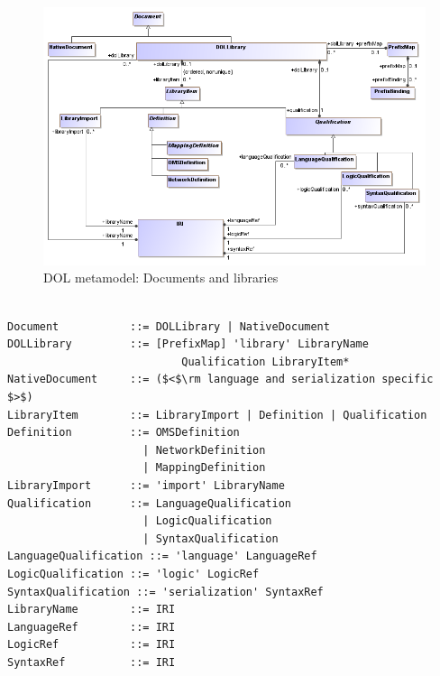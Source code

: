 \documentclass[10pt, a4paper]{isov2}
\begin{document}
\medskip
\begin{figure}
  \centering
    \includegraphics[scale=0.47]{mof/libraries.png}
  \caption{DOL metamodel: Documents and libraries}
  \label{fig:libraries}
\end{figure}


\vspace{-2em}

\begin{lstlisting}[language=ebnf,escapeinside={()},morecomment={[l]{\%\%\ }}]

Document           ::= DOLLibrary | NativeDocument
DOLLibrary         ::= [PrefixMap] 'library' LibraryName
                           Qualification LibraryItem*
NativeDocument     ::= ($<$\rm language and serialization specific $>$) 
LibraryItem        ::= LibraryImport | Definition | Qualification
Definition         ::= OMSDefinition
                     | NetworkDefinition
                     | MappingDefinition
LibraryImport      ::= 'import' LibraryName
Qualification      ::= LanguageQualification
                     | LogicQualification
                     | SyntaxQualification
LanguageQualification ::= 'language' LanguageRef
LogicQualification ::= 'logic' LogicRef
SyntaxQualification ::= 'serialization' SyntaxRef
LibraryName        ::= IRI
LanguageRef        ::= IRI
LogicRef           ::= IRI
SyntaxRef          ::= IRI
\end{lstlisting}
\end{document}
